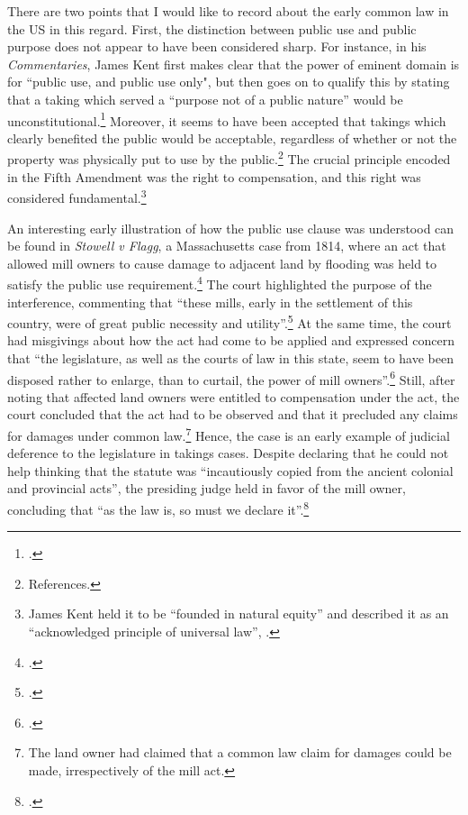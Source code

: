 There are two points that I would like to record about the early common law in the US  in this regard. First, the distinction between public use and public purpose does not appear to have been considered sharp. For instance, in his {\it Commentaries}, James Kent first makes clear that the power of eminent domain is for ``public use, and public use only", but then goes on to qualify this by stating that a taking which served a ``purpose not of a public nature'' would be unconstitutional.\footcite[See][275-276]{kent27}  Moreover, it seems to have been accepted that takings which clearly benefited the public would be acceptable, regardless of whether or not the property was physically put to use by the public.\footnote{References.} The crucial principle encoded in the Fifth Amendment was the right to compensation, and this right was considered fundamental.\footnote{James Kent held it to be  ``founded in natural equity'' and described it as an ``acknowledged principle of universal law'', \cite[see][276]{kent27}.}

An interesting early illustration of how the public use clause was understood can be found in {\it Stowell v Flagg}, a Massachusetts case from 1814, where an act that allowed mill owners to cause damage to adjacent land by flooding was held to satisfy the public use requirement.\footcite{stowell14} The court highlighted the purpose of the interference, commenting that ``these mills, early in the settlement of this country, were of great public necessity and utility''.\footcite[366]{stowell14} At the same time, the court had misgivings about how the act had come to be applied and expressed concern that ``the legislature, as well as the courts of law in this state, seem to have been disposed rather to enlarge, than to curtail, the power of mill owners''.\footcite[366]{stowell14} Still, after noting that  affected land owners were entitled to compensation under the act, the court concluded that the act had to be observed and that it precluded any claims for damages under common law.\footnote{The land owner had claimed that a common law claim for damages could be made, irrespectively of the mill act.} Hence, the case is an early example of judicial deference to the legislature in takings cases. Despite declaring that he could not help thinking that the statute was ``incautiously copied from the ancient colonial and provincial acts'', the presiding judge held in favor of the mill owner,  concluding that ``as the law is, so must we declare it''.\footcite[368]{stowell14}

